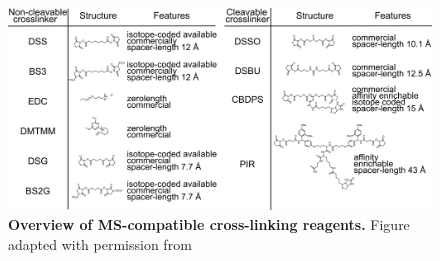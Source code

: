 \begin{figure}[hbt!]
    \center
    \includegraphics[]{Chapter.1/Figures/Figure2.png} 
    \caption{\textbf{Overview of MS-compatible cross-linking reagents.} Figure adapted with permission from \cite{Steigenberger_2020}}
    \label{fig:fig2}
\end{figure}

